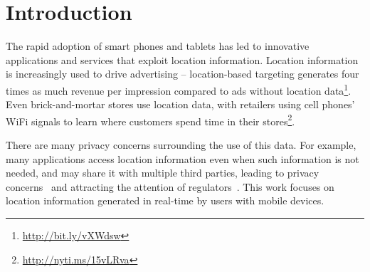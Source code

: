 \section{Introduction}
\label{sec:intro}



The rapid adoption of smart phones and tablets has led to innovative applications and services
that exploit location information. Location information is increasingly used to
drive advertising -- location-based targeting generates four times as much revenue per impression compared to ads 
without location data\footnote{\url{http://bit.ly/vXWdsw}}. Even brick-and-mortar stores use location data, with retailers 
using cell phones' WiFi signals to learn where customers spend time in their stores\footnote{\url{http://nyti.ms/15vLRva}}.

There are many privacy concerns surrounding the use of this data.
For example, many applications access location information even when such information is not needed, and may share it 
with multiple third parties, leading to privacy concerns~\cite{Enck:2010, WSJ:apple} and attracting 
the attention of regulators~\cite{USC:location, jones2012us}.
This work focuses on location information generated in real-time by users with mobile devices.


